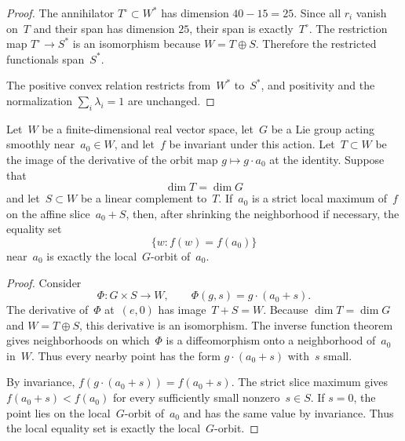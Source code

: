 \begin{proof}
The annihilator $T^\circ\subset W^*$ has dimension
$40-15=25$.  Since all $r_i$ vanish on~$T$ and their span has dimension
$25$, their span is exactly~$T^\circ$.  The restriction map
$T^\circ\to S^*$ is an isomorphism because $W=T\oplus S$.  Therefore the
restricted functionals span~$S^*$.

The positive convex relation restricts from~$W^*$ to~$S^*$, and positivity
and the normalization $\sum_i\lambda_i=1$ are unchanged.
\end{proof}

\begin{lemma}
\label{lem:hko-transverse-symmetry-slice}
Let~$W$ be a finite-dimensional real vector space, let~$G$ be a Lie group
acting smoothly near~$a_0\in W$, and let~$f$ be invariant under this action.
Let~$T\subset W$ be the image of the derivative of the orbit map
$g\mapsto g\cdot a_0$ at the identity.  Suppose that
\[
  \dim T=\dim G
\]
and let~$S\subset W$ be a linear complement to~$T$.  If~$a_0$ is a strict
local maximum of~$f$ on the affine slice~$a_0+S$, then, after shrinking the
neighborhood if necessary, the equality set
\[
  \{w:f(w)=f(a_0)\}
\]
near~$a_0$ is exactly the local~$G$-orbit of~$a_0$.
\end{lemma}

\begin{proof}
Consider
\[
  \Phi\colon G\times S\to W,
  \qquad
  \Phi(g,s)=g\cdot(a_0+s).
\]
The derivative of~$\Phi$ at~$(e,0)$ has image~$T+S=W$.  Because
$\dim T=\dim G$ and $W=T\oplus S$, this derivative is an isomorphism.
The inverse function theorem gives neighborhoods on which~$\Phi$ is a
diffeomorphism onto a neighborhood of~$a_0$ in~$W$.  Thus every nearby point
has the form $g\cdot(a_0+s)$ with~$s$ small.

By invariance, $f(g\cdot(a_0+s))=f(a_0+s)$.  The strict slice maximum gives
$f(a_0+s)<f(a_0)$ for every sufficiently small nonzero~$s\in S$.  If
$s=0$, the point lies on the local~$G$-orbit of~$a_0$ and has the same value
by invariance.  Thus the local equality set is exactly the local~$G$-orbit.
\end{proof}

